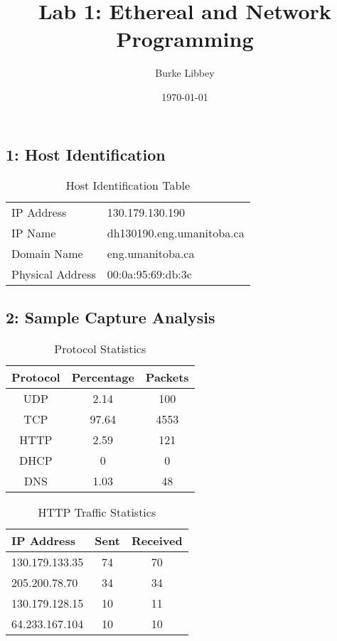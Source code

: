 \documentclass[10pt,letterpaper,titlepage]{article}
\begin{document}
\author{Burke Libbey}
\date{\today}
\title{Lab 1: Ethereal and Network Programming}

\maketitle

\subsection*{1: Host Identification}
\begin{table}[ht] 
\caption{Host Identification Table}
\centering
\begin{tabular}{l l}
\hline\hline
IP Address       & 130.179.130.190 \\
IP Name          & dh130190.eng.umanitoba.ca \\
Domain Name      & eng.umanitoba.ca \\
Physical Address & 00:0a:95:69:db:3c \\
\hline
\end{tabular} 
\end{table}

\subsection*{2: Sample Capture Analysis}
\begin{table}[ht]
\caption{Protocol Statistics}
\centering
\begin{tabular}{c c c}
\hline\hline
Protocol & Percentage & Packets \\
\hline
UDP      & 2.14       & 100  \\ 
TCP      & 97.64      & 4553 \\ 
HTTP     & 2.59       & 121  \\ 
DHCP     & 0          & 0    \\ 
DNS      & 1.03       & 48   \\ 
\hline
\end{tabular}
\end{table}

\begin{table}[ht]
\caption{HTTP Traffic Statistics}
\centering
\begin{tabular}{l c c}
\hline\hline
IP Address      & Sent & Received \\
\hline
130.179.133.35  & 74   & 70 \\
205.200.78.70   & 34   & 34 \\
130.179.128.15  & 10   & 11 \\
64.233.167.104  & 10   & 10 \\
\hline
\end{tabular}
\end{table}
\end{document}
